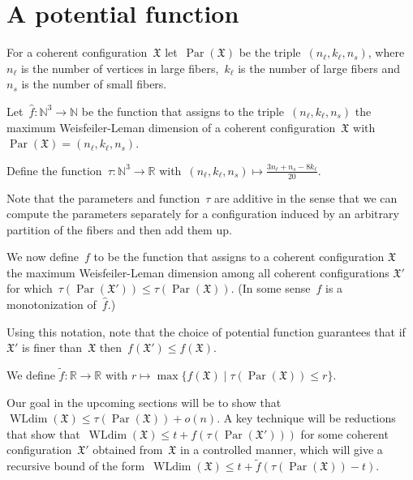 \documentclass[english,a4paper]{article}
\theoremstyle{plain}
\theoremstyle{definition}
\newcommand{\Nat}{\ensuremath{\mathbb{N}}}
\newcommand{\Rel}{\ensuremath{\mathbb{R}}}
\newcommand{\coherentConfig}{\ensuremath{\mathfrak{X}}}
\DeclareMathOperator*{\WLdim}{WLdim}
\newcommand{\wldim}[1]{\ensuremath{\WLdim\left(#1\right)}}
\newcommand{\f}{f}
\DeclareMathOperator{\parameters}{Par}
\begin{document}
\section{A potential function}
\label{sec:potential:func}


For a coherent configuration~$\coherentConfig$ let~$\parameters(\coherentConfig)$ be the triple~$(n_\ell, k_\ell,n_s)$, where~$n_\ell$ is the number of vertices in large fibers,~$k_\ell$ is the number of large fibers and~$n_s$ is the number of small fibers.

Let~$\widehat{\f} \colon \Nat^3 \longrightarrow \Nat$ be the function that assigns to the triple~$(n_\ell, k_\ell,n_s)$ the maximum Weisfeiler-Leman dimension of a coherent configuration~$\coherentConfig$ with~$\parameters(\coherentConfig)=(n_\ell, k_\ell,n_s)$.

Define the function~$\tau \colon \Nat^3 \rightarrow \Rel$ with~$(n_\ell, k_\ell, n_s) \mapsto \frac{3n_\ell + n_s - 8k_\ell}{20}$.

Note that the parameters and function~$\tau$ are additive in the sense that we can compute the parameters separately for a configuration induced by an arbitrary partition of the fibers and then add them up.

We now define~$\f$ to be the function that assigns to a coherent configuration $\coherentConfig$ the maximum Weisfeiler-Leman dimension among all coherent configurations $\coherentConfig'$ for which~$\tau(\parameters(\coherentConfig'))\leq \tau(\parameters(\coherentConfig))$. (In some sense~$f$ is a monotonization of~$\widehat{f}$.)

Using this notation, note that the choice of potential function guarantees that if~$\coherentConfig'$ is finer than~$\coherentConfig$ then~$\f(\coherentConfig')\leq \f(\coherentConfig)$.

We define $\widetilde{\f} \colon \Rel \longrightarrow \Rel$ with $r \mapsto \max \{ \f(\coherentConfig) \mid \tau (\parameters(\coherentConfig)) \leq r \}$.

Our goal in the upcoming sections will be to show that~$\wldim{\coherentConfig}\leq \tau(\parameters(\coherentConfig))+o(n)$. A key technique will be reductions that show that~$\wldim{\coherentConfig}\leq t+ \f(\tau (\parameters(\coherentConfig')))$ for some coherent configuration~$\coherentConfig'$ obtained from~$\coherentConfig$ in a controlled manner, which will give a recursive bound of the form~$\wldim{\coherentConfig}
 \leq t + \widetilde{f} (\tau(\parameters(\coherentConfig)) -t)$.     
\end{document}
